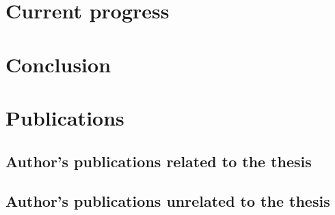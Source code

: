 \documentclass[11pt]{article}
\begin{document}
\section{Current progress}
\label{sec:current_progress}


\section{Conclusion}
\label{sec:conclusion}


\section{Publications}
\label{sec:publications}\nocite{*}

\subsection*{Author's publications related to the thesis}
\printbibliography[keyword=related,heading=none]

\subsection*{Author's publications unrelated to the thesis}
\printbibliography[keyword=unrelated,heading=none]

\printbibliography[keyword=foreign]
\end{document}
